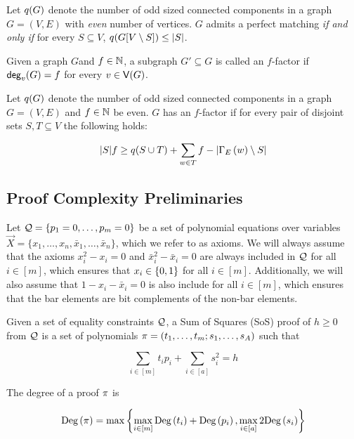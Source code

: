 \documentclass[11pt]{article}
\begin{document}
\begin{lemma}\label{lemma:tutte-criterion}
Let $q(G)$ denote the number of odd sized connected components in a graph $G=(V,E)$ with \emph{even} number of vertices.
$G$ admits a perfect matching \emph{if and only if} for every $S \subseteq V$, $q(G[V \setminus S]) \leq |S|$.
\end{lemma}

\begin{definition}[$f$-factor]\label{defn:f-factor}
  Given a graph $G $and $f \in \mathbb{N}$, a subgraph $G' \subseteq G$ is called an $f$-factor if $\mathsf{deg}_{v}(G) = f$ for every $v \in \mathsf{V}(G)$.
\end{definition}

\begin{lemma}\label{lemma:tutte-criterion-factor}
  Let $q(G)$ denote the number of odd sized connected components in a graph $G=(V,E)$ and $f \in \mathbb{N}$ be even. $G$ has an $f$-factor if for every pair of disjoint sets $S, T \subseteq V$ the following holds:

  \[ |S|f \geq q(S \cup T) + \sum_{w \in T} f - |\Gamma_{E}\left(w\right) \setminus S| \]
\end{lemma}


\subsection{Proof Complexity Preliminaries}
\label{sec:proof-system-prelims}

Let $\mathcal{Q} = \{ p_1 = 0, \dots, p_m = 0\}$ be a set of polynomial equations over variables $\vec{X} = \{x_1, \dots, x_n, \bar{x}_1, \dots, \bar{x}_n\}$, which we refer to as axioms.
We will always assume that the axioms $x_i^2 - x_i = 0$ and $\bar{x}_i^2 - \bar{x}_i = 0$ are always included in $\mathcal{Q}$ for all $i \in [m]$, which ensures that $x_i \in \{0,1\}$ for all $i\in [m]$.
Additionally, we will also assume that $1 - x_i - \bar{x}_i=0$ is also include for all $i \in [m]$, which ensures that the bar elements are bit complements of the non-bar elements.

\begin{definition}\label{def:sum-of-squares} Given a set of equality constraints $\mathcal{Q}$, a Sum of Squares (SoS) proof of $h \geq 0$ from $\mathcal{Q}$ is a set of polynomials $\pi = (t_1, \dots, t_m; s_1, \dots, s_A)$ such that

\[ \sum_{i \in [m]} t_ip_i+ \sum_{i \in [a]} s_i^2 = h\]

The degree of a proof $\pi$ is

\[ \text{Deg}\left(\pi\right) = \max\left\{\max_{i \in [m]} \text{Deg}\left(t_i\right) + \text{Deg}\left(p_i\right), \max_{i \in [a]} 2\text{Deg}\left(s_i\right)\right\}\]


\end{definition}
\end{document}
